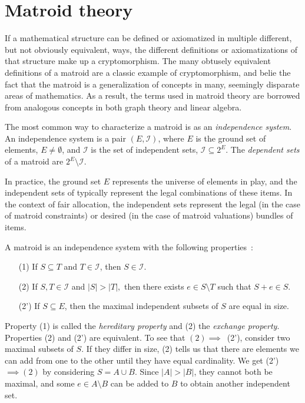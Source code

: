 \section{Matroid theory}
\label{sec:matroid-theory}
If a mathematical structure can be defined or axiomatized in multiple different, but not obviously equivalent, ways, the different definitions or axiomatizations of that structure make up a cryptomorphism. The many obtusely equivalent definitions of a matroid are a classic example of cryptomorphism, and belie the fact that the matroid is a generalization of concepts in many, seemingly disparate areas of mathematics. As a result, the terms used in matroid theory are borrowed from analogous concepts in both graph theory and linear algebra. 

The most common way to characterize a matroid is as an \textit{independence system}. An independence system is a pair $(E, \mathcal{I})$, where $E$ is the ground set of elements, $E \not= \emptyset$, and $\mathcal{I}$ is the set of independent sets, $\mathcal{I} \subseteq 2^E$. The \textit{dependent sets} of a matroid are $2^E \setminus \mathcal{I}$. 

In practice, the ground set $E$ represents the universe of elements in play, and the independent sets of typically represent the legal combinations of these items. In the context of fair allocation, the independent sets represent the legal (in the case of matroid constraints) or desired (in the case of matroid valuations) bundles of items.

A matroid is an independence system with the following properties~\cite{whitney-1935}:
\begin{enumerate}
  \item[(1)] If $S \subseteq T$ and $T \in \mathcal{I}$, then $S \in \mathcal{I}$.
  \item[(2)] If $S, T \in \mathcal{I}$ and $|S| > |T|,$ then there exists $e \in S \setminus T$ such that $S + e \in S$.
  \item[(2')] If $S \subseteq E$, then the maximal independent subsets of $S$ are equal in size.
\end{enumerate}
Property (1) is called the \textit{hereditary property} and (2) the \textit{exchange property}. Properties (2) and (2') are equivalent. To see that $(2) \implies$~(2'), consider two maximal subsets of $S$. If they differ in size, (2) tells us that there are elements we can add from one to the other until they have equal cardinality. We get (2')~$\implies (2)$ by considering $S = A \cup B$. Since $|A|>|B|$, they cannot both be maximal, and some $e \in A \setminus B$ can be added to $B$ to obtain another independent set. 

